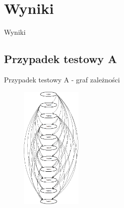 \documentclass{beamer}
\begin{document}
\section{Wyniki}
\begin{frame}{}
\begin{center}
\huge{Wyniki}
\end{center}
\end{frame}

\subsection*{Przypadek testowy A}

\begin{frame}{Przypadek testowy A - graf zależności}
\begin{figure}[H]
	\begin{center}
  		\includegraphics[height=6cm]{TestA.png}
	\end{center}
\end{figure}
\end{frame}
\end{document}
